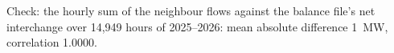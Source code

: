 \parbox{\textwidth}{\footnotesize Check: the hourly sum of the neighbour flows against the balance file's net interchange over 14,949 hours of 2025--2026: mean absolute difference 1~MW, correlation 1.0000.}